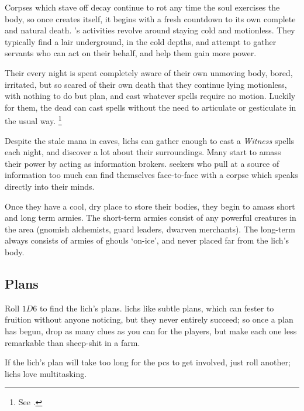 \begin{multicols}{2}

\noindent
Corpses which stave off decay continue to rot any time the soul exercises the body, so once  creates itself, it begins with a fresh countdown to its own complete and natural death.
's activities revolve around staying cold and motionless.
They typically find a lair underground, in the cold depths, and attempt to gather servants who can act on their behalf, and help them gain more power.

Their every night is spent completely aware of their own unmoving body, bored, irritated, but so scared of their own death that they continue lying motionless, with nothing to do but plan, and cast whatever spells require no motion.
Luckily for them, the dead can cast spells without the need to articulate or gesticulate in the usual way.%
\footnote{See .}

Despite the stale mana in caves, \glspl{lich} can gather enough to cast a \textit{Witness} spells each night, and discover a lot about their surroundings.
Many start to amass their power by acting as information brokers.
\Glspl{seeker} who pull at a source of information too much can find themselves face-to-face with a corpse which speaks directly into their minds.

\lich

Once they have a cool, dry place to store their bodies, they begin to amass short and long term armies.
The short-term armies consist of any powerful creatures in the area (gnomish alchemists, \gls{guard} leaders, dwarven merchants).
The long-term always consists of armies of \glspl{ghoul} `on-ice', and never placed far from the \gls{lich}'s body.

\showStdSpells

\subsection{Plans}

Roll $1D6$ to find the \gls{lich}'s plans.
\Glspl{lich} like subtle plans, which can fester to fruition without anyone noticing, but they never entirely succeed; so once a plan has begun, drop as many clues as you can for the players, but make each one less remarkable than sheep-shit in a farm.

If the \gls{lich}'s plan will take too long for the \glspl{pc} to get involved, just roll another; \glspl{lich} love multitasking.


\end{multicols}
